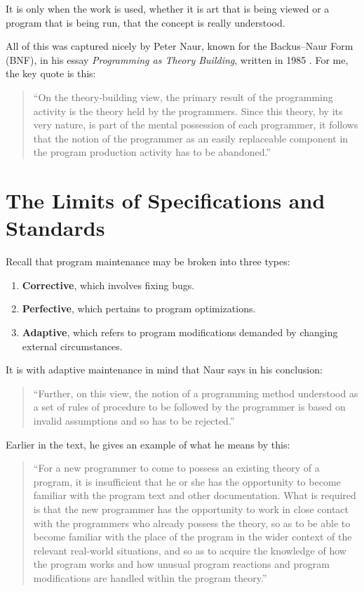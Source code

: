 \documentclass[12pt]{article}
\theoremstyle{plain}
\theoremstyle{definition}
\theoremstyle{remark}
\begin{document}
\noindent It is only when the work is used, whether it is art that is
being viewed or a program that is being run, that the concept is
really understood.

All of this was captured nicely by Peter Naur, known for the
Backus--Naur Form (BNF), in his essay \emph{Programming as Theory
  Building}, written in 1985 \cite{naur1985}. For me, the key quote
is this:
\begin{quote}
  ``On the theory-building view, the primary result of the programming
  activity is the theory held by the programmers. Since this theory,
  by its very nature, is part of the mental possession of each
  programmer, it follows that the notion of the programmer as an
  easily replaceable component in the program production activity has
  to be abandoned.''
\end{quote}

\section{The Limits of Specifications and Standards}

Recall that program maintenance may be broken into three types:
\begin{enumerate}
  \item \textbf{Corrective}, which involves fixing bugs.
  \item \textbf{Perfective}, which pertains to program optimizations.
  \item \textbf{Adaptive}, which refers to program modifications
    demanded by changing external circumstances.
\end{enumerate}

\noindent It is with adaptive maintenance in mind that Naur says in
his conclusion:
\begin{quote}
  ``Further, on this view, the notion of a programming method
  understood as a set of rules of procedure to be followed by the
  programmer is based on invalid assumptions and so has to be
  rejected.''
\end{quote}

\noindent Earlier in the text, he gives an example of what he means by
this:
\begin{quote}
  ``For a new programmer to come to possess an existing theory of a
  program, it is insufficient that he or she has the opportunity to
  become familiar with the program text and other documentation. What
  is required is that the new programmer has the opportunity to work
  in close contact with the programmers who already possess the
  theory, so as to be able to become familiar with the place of the
  program in the wider context of the relevant real-world situations,
  and so as to acquire the knowledge of how the program works and how
  unusual program reactions and program modifications are handled
  within the program theory.''
\end{quote}
\end{document}

